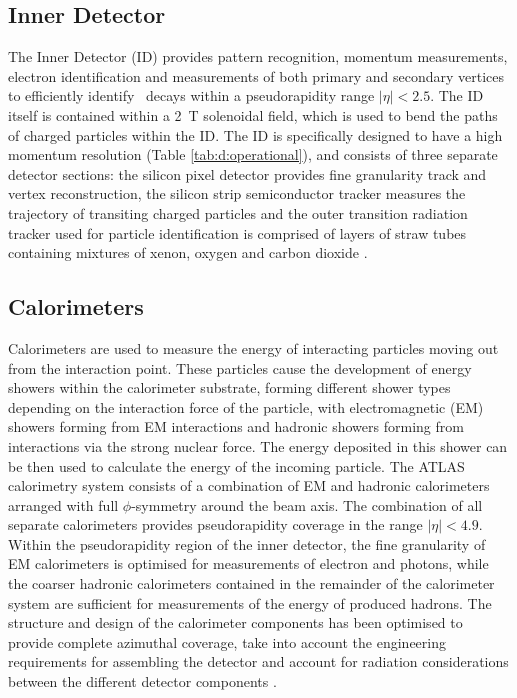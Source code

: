 	\subsection{Inner Detector}
	\label{d:id}

		The Inner Detector \cite{innerdetector} (ID) provides pattern recognition, momentum measurements, electron identification and measurements of both primary and secondary vertices to efficiently identify \bhadron\, decays within a pseudorapidity range $|\eta|<2.5$. The ID itself is contained within a 2~T solenoidal field, which is used to bend the paths of charged particles within the ID. The ID is specifically designed to have a high momentum resolution (Table \ref{tab:d:operational}), and consists of three separate detector sections: the silicon pixel detector provides fine granularity track and vertex reconstruction, the silicon strip semiconductor tracker measures the trajectory of transiting charged particles and the outer transition radiation tracker used for particle identification is comprised of layers of straw tubes containing mixtures of xenon, oxygen and carbon dioxide \cite{ATLAS}.

	\subsection{Calorimeters}

		Calorimeters are used to measure the energy of interacting particles moving out from the interaction point. These particles cause the development of energy showers within the calorimeter substrate, forming different shower types depending on the interaction force of the particle, with electromagnetic (EM)  showers forming from EM interactions and hadronic showers forming from interactions via the strong nuclear force. The energy deposited in this shower can be then used to calculate the energy of the incoming particle. The ATLAS calorimetry system consists of a combination of EM and hadronic calorimeters arranged with full $\phi$-symmetry around the beam axis. The combination of all separate calorimeters provides pseudorapidity coverage in the range $|\eta| < 4.9$. Within the pseudorapidity region of the inner detector, the fine granularity of EM calorimeters is optimised for measurements of electron and photons, while the coarser hadronic calorimeters contained in the remainder of the calorimeter system are sufficient for measurements of the energy of produced hadrons. The structure and design of the calorimeter components has been optimised to provide complete azimuthal coverage, take into account the engineering requirements for assembling the detector and account for radiation considerations between the different detector components \cite{ATLAS}.

